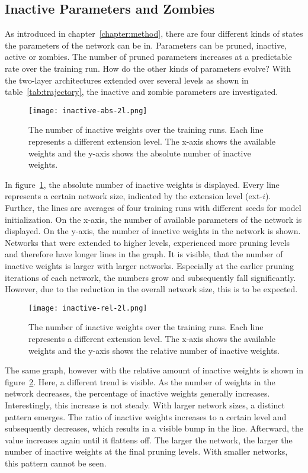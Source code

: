 \subsection{Inactive Parameters and Zombies}
As introduced in chapter~\ref{chapter:method}, there are four different kinds of states the parameters of the network can be in.
Parameters can be pruned, inactive, active or zombies.
The number of pruned parameters increases at a predictable rate over the training run.
How do the other kinds of parameters evolve?
With the two-layer architectures extended over several levels as shown in table~\ref{tab:trajectory}, the inactive and zombie parameters are investigated.

\begin{figure}[t]
    \centering
    \texttt{[image: inactive-abs-2l.png]}
    \caption[Inactive Weights during training runs, absolute]{
        The number of inactive weights over the training runs. 
        Each line represents a different extension level. 
        The x-axis shows the available weights and the y-axis shows the absolute number of inactive weights.
    }\label{fig:inactive-abs}
\end{figure}

In figure~\ref{fig:inactive-abs}, the absolute number of inactive weights is displayed.
Every line represents a certain network size, indicated by the extension level (ext-$i$).
Further, the lines are averages of four training runs with different seeds for model initialization.
On the x-axis, the number of available parameters of the network is displayed.
On the y-axis, the number of inactive weights in the network is shown.
Networks that were extended to higher levels, experienced more pruning levels and therefore have longer lines in the graph.
It is visible, that the number of inactive weights is larger with larger networks.
Especially at the earlier pruning iterations of each network, the numbers grow and subsequently fall significantly.
However, due to the reduction in the overall network size, this is to be expected.

\begin{figure}[t]
    \centering
    \texttt{[image: inactive-rel-2l.png]}
    \caption[Inactive Weights during training runs, relative]{
        The number of inactive weights over the training runs. 
        Each line represents a different extension level. 
        The x-axis shows the available weights and the y-axis shows the relative number of inactive weights.
        }\label{fig:inactive-rel}
\end{figure}
The same graph, however with the relative amount of inactive weights is shown in figure~\ref{fig:inactive-rel}.
Here, a different trend is visible.
As the number of weights in the network decreases, the percentage of inactive weights generally increases.
Interestingly, this increase is not steady.
With larger network sizes, a distinct pattern emerges.
The ratio of inactive weights increases to a certain level and subsequently decreases, which results in a visible bump in the line.
Afterward, the value increases again until it flattens off.
The larger the network, the larger the number of inactive weights at the final pruning levels.
With smaller networks, this pattern cannot be seen.

